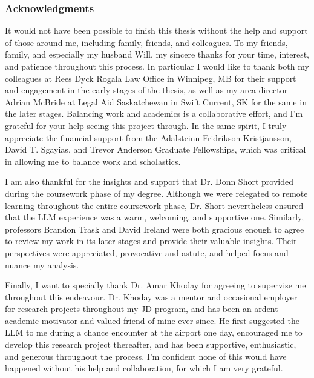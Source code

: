 \thispagestyle{empty}

\begin{center}
    \subsubsection*{Acknowledgments}
\end{center}

\noindent
It would not have been possible to finish this thesis without the help and support of those around me, including family, friends, and colleagues. To my friends, family, and especially my husband Will, my sincere thanks for your time, interest, and patience throughout this process. In particular I would like to thank both my colleagues at Rees Dyck Rogala Law Office in Winnipeg, MB for their support and engagement in the early stages of the thesis, as well as my area director Adrian McBride at Legal Aid Saskatchewan in Swift Current, SK for the same in the later stages. Balancing work and academics is a collaborative effort, and I'm grateful for your help seeing this project through. In the same spirit, I truly appreciate the financial support from the Adalsteinn Fridrikson Kristjansson, David T. Sgayias, and Trevor Anderson Graduate Fellowships, which was critical in allowing me to balance work and scholastics.

I am also thankful for the insights and support that Dr. Donn Short provided during the coursework phase of my degree. Although we were relegated to remote learning throughout the entire coursework phase, Dr. Short nevertheless ensured that the LLM experience was a warm, welcoming, and supportive one. Similarly, professors Brandon Trask and David Ireland were both gracious enough to agree to review my work in its later stages and provide their valuable insights. Their perspectives were appreciated, provocative and astute, and helped focus and nuance my analysis.

Finally, I want to specially thank Dr. Amar Khoday for agreeing to supervise me throughout this endeavour. Dr. Khoday was a mentor and occasional employer for research projects throughout my JD program, and has been an ardent academic motivator and valued friend of mine ever since. He first suggested the LLM to me during a chance encounter at the airport one day, encouraged me to develop this research project thereafter, and has been supportive, enthusiastic, and generous throughout the process. I'm confident none of this would have happened without his help and collaboration, for which I am very grateful.